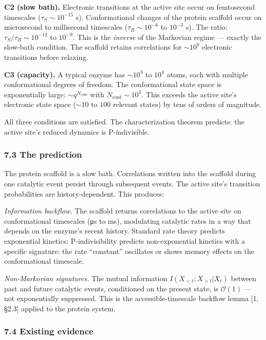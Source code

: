 \documentclass[
]{article}
\begin{document}
\textbf{C2 (slow bath).} Electronic transitions at the active site occur
on femtosecond timescales (\(\tau_S \sim 10^{-15}\) s). Conformational
changes of the protein scaffold occur on microsecond to millisecond
timescales (\(\tau_B \sim 10^{-6}\) to \(10^{-3}\) s). The ratio:
\(\tau_S / \tau_B \sim 10^{-12}\) to \(10^{-9}\). This is the
\emph{inverse} of the Markovian regime --- exactly the slow-bath
condition. The scaffold retains correlations for \(\sim 10^9\)
electronic transitions before relaxing.

\textbf{C3 (capacity).} A typical enzyme has \(\sim 10^3\) to \(10^4\)
atoms, each with multiple conformational degrees of freedom. The
conformational state space is exponentially large:
\(\sim q^{N_{\text{conf}}}\) with \(N_{\text{conf}} \sim 10^3\). This
exceeds the active site's electronic state space (\(\sim 10\) to \(100\)
relevant states) by tens of orders of magnitude.

All three conditions are satisfied. The characterization theorem
predicts: the active site's reduced dynamics is P-indivisible.

\hypertarget{the-prediction}{%
\subsubsection{7.3 The prediction}\label{the-prediction}}

The protein scaffold is a slow bath. Correlations written into the
scaffold during one catalytic event persist through subsequent events.
The active site's transition probabilities are history-dependent. This
produces:

\emph{Information backflow.} The scaffold returns correlations to the
active site on conformational timescales (μs to ms), modulating
catalytic rates in a way that depends on the enzyme's recent history.
Standard rate theory predicts exponential kinetics; P-indivisibility
predicts non-exponential kinetics with a specific signature: the rate
``constant'' oscillates or shows memory effects on the conformational
timescale.

\emph{Non-Markovian signatures.} The mutual information
\(I(X_{<t}; X_{>t} | X_t)\) between past and future catalytic events,
conditioned on the present state, is \(\mathcal{O}(1)\) --- not
exponentially suppressed. This is the accessible-timescale backflow
lemma {[}1, §2.3{]} applied to the protein system.

\hypertarget{existing-evidence}{%
\subsubsection{7.4 Existing evidence}\label{existing-evidence}}
\end{document}
